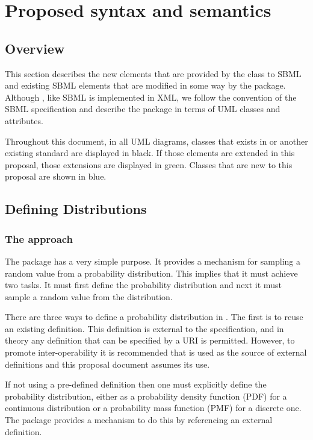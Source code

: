 \documentclass[draftspec]{sbmlpkgspec}
\begin{document}
\section{Proposed syntax and semantics}

\subsection{Overview}

This section describes the new elements that are provided by the class
to SBML and existing SBML elements that are modified in some way by
the package. Although \distribshort, like SBML is implemented in XML,
we follow the convention of the SBML specification and describe the
package in terms of UML classes and attributes.

Throughout this document, in all UML diagrams, classes that exists in
\sbmlverone or another existing standard are displayed in
black. If those elements are extended in this proposal, those
extensions are displayed in green. Classes that are new to this
proposal are shown in blue.

\subsection{Defining Distributions}

\subsubsection{The approach}

The \distrib package has a very simple purpose. It provides a
mechanism for sampling a random value from a probability
distribution. This implies that it must achieve two tasks. It must
first define the probability distribution and next it must sample a
random value from the distribution.

There are three ways to define a probability distribution in
\distribshort. The first is to reuse an existing definition. This
definition is external to the \distribshort specification, and in
theory any definition that can be specified by a URI is permitted. However, to
promote inter-operability it is recommended that \uncertml is used as
the source of external definitions and this proposal document assumes
its use.

If not using a pre-defined definition then one must explicitly define
the probability distribution, either as a probability density function (PDF)
for a continuous distribution or a probability mass function (PMF) for
a discrete one. The \distrib package provides a mechanism to do this
by referencing an external definition.
\end{document}
